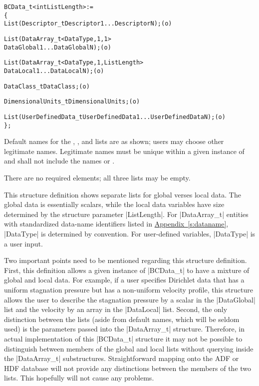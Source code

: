 \begin{alltt}
  BCData\_t< int ListLength > :=
    \{
    List( Descriptor\_t  Descriptor1 ... DescriptorN ) ;                     (o)

    List( DataArray\_t<DataType, 1, 1>     
          DataGlobal1 ... DataGlobalN ) ;                                   (o)

    List( DataArray\_t<DataType, 1, ListLength>       
          DataLocal1 ... DataLocalN ) ;                                     (o)

    DataClass\_t DataClass ;                                                 (o)
                
    DimensionalUnits\_t DimensionalUnits ;                                   (o)

    List( UserDefinedData\_t UserDefinedData1 ... UserDefinedDataN ) ;       (o)
    \} ;
\end{alltt}

\begin{notes}
\item
 Default names for the , , and
 lists are as shown; users may choose other legitimate names.
 Legitimate names must be unique within a given instance of
  and shall not include the names  or
 .
\item
 There are no required elements; all three lists may be empty.
\end{notes}

This structure definition shows separate lists for global verses local
data.  The global data is essentially scalars, while the local data
variables have size determined by the structure parameter |ListLength|.
For |DataArray_t| entities with standardized data-name identifiers
listed in \hyperref[s:dataname]{Appendix~\ref*{s:dataname}}, |DataType|
is determined by convention.
For user-defined variables, |DataType| is a user input.

Two important points need to be mentioned regarding this structure
definition.  First, this definition allows a given instance of
|BCData_t| to have a mixture of global and local data.  For example, if
a user specifies Dirichlet data that has a uniform stagnation pressure
but has a non-uniform velocity profile, this structure allows the user
to describe the stagnation pressure by a scalar in the |DataGlobal| list
and the velocity by an array in the |DataLocal| list.  Second, the only
distinction between the lists (aside from default names, which will be
seldom used) is the parameters passed into the |DataArray_t| structure.
Therefore, in actual implementation of this |BCData_t| structure it
may not be possible to distinguish between members of the global and
local lists without querying inside the |DataArray_t| substructures.
Straightforward mapping onto the ADF or HDF database will not provide any
distinctions between the members of the two lists.  This hopefully will
not cause any problems.

